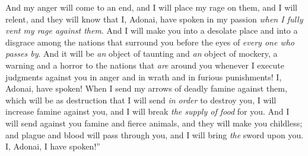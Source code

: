 \begin{biblechapter}
\verse And my anger will come to an end, and I will place my rage on them, and I will relent, and they will know that I, Adonai, have spoken in my passion \textit{when I fully vent my rage against them}.
\verse And I will make you into a desolate place and into a disgrace among the nations that surround you before the eyes of \textit{every one who passes by}.
\verse And it will be \textit{an} object of taunting and \textit{an} object of mockery, a warning and a horror to the nations that \textit{are} around you whenever I execute judgments against you in anger and in wrath and in furious punishments! I, Adonai, have spoken!
\verse When I send my arrows of deadly famine against them, which will be as destruction that I will send \textit{in order} to destroy you, I will increase famine against you, and I will break \textit{the supply of food} for you.
\verse And I will send against you famine and fierce animals, and they will make you childless; and plague and blood will pass through you, and I will bring \textit{the} sword upon you. I, Adonai, I have spoken!”
\end{biblechapter}

